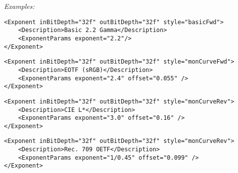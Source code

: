 \emph{Examples:}
\begin{lstlisting}[caption=Using \xml{Exponent} node for applying a 2.2 gamma.]
<Exponent inBitDepth="32f" outBitDepth="32f" style="basicFwd">
	<Description>Basic 2.2 Gamma</Description>
	<ExponentParams exponent="2.2"/>
</Exponent>
\end{lstlisting}

\begin{lstlisting}[caption=Using \xml{Exponent} node for applying the intended EOTF found in IEC 61966-2-1:1999 (sRGB).]
<Exponent inBitDepth="32f" outBitDepth="32f" style="monCurveFwd">
	<Description>EOTF (sRGB)</Description>
	<ExponentParams exponent="2.4" offset="0.055" />
</Exponent>
\end{lstlisting}

\begin{lstlisting}[caption=Using \xml{Exponent} node to apply CIE L* formula.]
<Exponent inBitDepth="32f" outBitDepth="32f" style="monCurveRev">
	<Description>CIE L*</Description>
	<ExponentParams exponent="3.0" offset="0.16" />
</Exponent>
\end{lstlisting}

\begin{lstlisting}[caption=Using \xml{Exponent} node to apply Rec. 709 OETF.]
<Exponent inBitDepth="32f" outBitDepth="32f" style="monCurveRev">
	<Description>Rec. 709 OETF</Description>
	<ExponentParams exponent="1/0.45" offset="0.099" />
</Exponent>
\end{lstlisting}